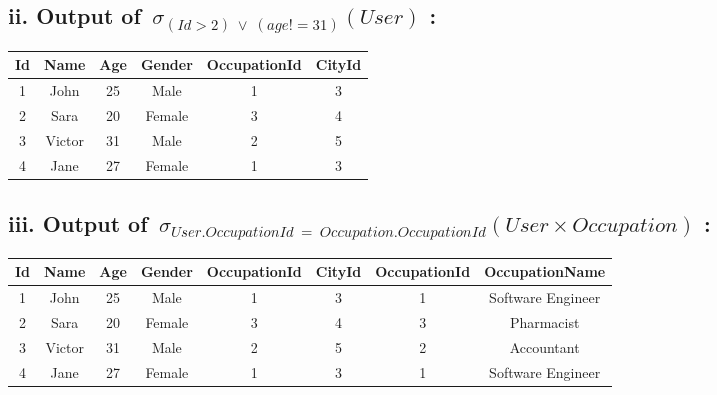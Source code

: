 \documentclass[12pt]{article}
\begin{document}
\subsection*{ii. Output of \,$\sigma_{(Id>2)~\vee~(age!=31)}(User)$ :}
\begin{table}[!hbt]
    \centering
    \begin{tabular}{|c|c|c|c|c|c|}
        \hline
        \textbf{Id} &
        \textbf{Name} &
        \textbf{Age} &
        \textbf{Gender} &
        \textbf{OccupationId} &
        \textbf{CityId} \\
        \hline
        1 & 
        John &
        25 &
        Male &
        1 &
        3 \\
        \hline
        2 & 
        Sara &
        20 &
        Female &
        3 &
        4 \\
        \hline
        3 & 
        Victor &
        31 &
        Male &
        2 &
        5 \\
        \hline
        4 & 
        Jane &
        27 &
        Female &
        1 &
        3 \\
        \hline
        \end{tabular}
    \label{tab:my_label}
\end{table}
\newpage

\subsection*{iii. Output of \,$\sigma_{User.OccupationId~=~Occupation.OccupationId}(User\times Occupation)$ :}
\begin{table}[!hbt]
    \centering
    \begin{tabular}{|c|c|c|c|c|c|c|c|}
        \hline
        \textbf{Id} &
        \textbf{Name} &
        \textbf{Age} &
        \textbf{Gender} &
        \textbf{OccupationId} &
        \textbf{CityId} &
        \textbf{OccupationId} &
        \textbf{OccupationName}\\
        \hline
        1 & 
        John &
        25 &
        Male &
        1 &
        3 &
        1 &
        Software Engineer\\
        \hline
        2 & 
        Sara &
        20 &
        Female &
        3 &
        4 &
        3 &
        Pharmacist\\
        \hline
        3 & 
        Victor &
        31 &
        Male &
        2 &
        5 &
        2 &
        Accountant\\
        \hline
        4 & 
        Jane &
        27 &
        Female &
        1 &
        3 &
        1 &
        Software Engineer\\
        \hline
        \end{tabular}
    \label{tab:my_label}
\end{table}
\end{document}
